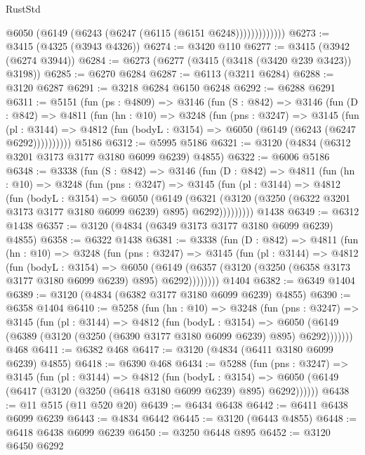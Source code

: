 \begin{lexlean}{RustStd}
\begin{coremodule}
{\begin{coremodule}
{{{{{{{{{{{{{{{{{{{{{{{{{{                  @6050 (@6149 (@6243 (@6247 (@6115 (@6151 @6248)))))))))))))
@6273 := @3415 (@4325 (@3943 @4326))
@6274 := @3420 @110
@6277 := @3415 (@3942 (@6274 @3944))
@6284 := @6273 (@6277 (@3415 (@3418 (@3420 @239 @3423)) @3198))
@6285 := @6270 @6284
@6287 := @6113 (@3211 @6284)
@6288 := @3120 @6287
@6291 := @3218 @6284 @6150 @6248
@6292 := @6288 @6291
@6311 := @5151
    (fun (ps : @4809) =>
    @3146
      (fun (S : @842) =>
      @3146
        (fun (D : @842) =>
        @4811
          (fun (hn : @10) =>
          @3248
            (fun (pns : @3247) =>
            @3145
              (fun (pl : @3144) =>
              @4812 (fun (bodyL : @3154) => @6050 (@6149 (@6243 (@6247 @6292))))))))))
    @5186
@6312 := @5995 @5186
@6321 := @3120 (@4834 (@6312 @3201 @3173 @3177 @3180 @6099 @6239) @4855)
@6322 := @6006 @5186
@6348 := @3338
    (fun (S : @842) =>
    @3146
      (fun (D : @842) =>
      @4811
        (fun (hn : @10) =>
        @3248
          (fun (pns : @3247) =>
          @3145
            (fun (pl : @3144) =>
            @4812
              (fun (bodyL : @3154) =>
              @6050
                (@6149
                  (@6321
                    (@3120 (@3250 (@6322 @3201 @3173 @3177 @3180 @6099 @6239) @895) @6292)))))))))
    @1438
@6349 := @6312 @1438
@6357 := @3120 (@4834 (@6349 @3173 @3177 @3180 @6099 @6239) @4855)
@6358 := @6322 @1438
@6381 := @3338
    (fun (D : @842) =>
    @4811
      (fun (hn : @10) =>
      @3248
        (fun (pns : @3247) =>
        @3145
          (fun (pl : @3144) =>
          @4812
            (fun (bodyL : @3154) =>
            @6050
              (@6149 (@6357 (@3120 (@3250 (@6358 @3173 @3177 @3180 @6099 @6239) @895) @6292))))))))
    @1404
@6382 := @6349 @1404
@6389 := @3120 (@4834 (@6382 @3177 @3180 @6099 @6239) @4855)
@6390 := @6358 @1404
@6410 := @5258
    (fun (hn : @10) =>
    @3248
      (fun (pns : @3247) =>
      @3145
        (fun (pl : @3144) =>
        @4812
          (fun (bodyL : @3154) =>
          @6050 (@6149 (@6389 (@3120 (@3250 (@6390 @3177 @3180 @6099 @6239) @895) @6292)))))))
    @468
@6411 := @6382 @468
@6417 := @3120 (@4834 (@6411 @3180 @6099 @6239) @4855)
@6418 := @6390 @468
@6434 := @5288
    (fun (pns : @3247) =>
    @3145
      (fun (pl : @3144) =>
      @4812
        (fun (bodyL : @3154) =>
        @6050 (@6149 (@6417 (@3120 (@3250 (@6418 @3180 @6099 @6239) @895) @6292))))))
@6438 := @11 @515 (@11 @520 @20)
@6439 := @6434 @6438
@6442 := @6411 @6438 @6099 @6239
@6443 := @4834 @6442
@6445 := @3120 (@6443 @4855)
@6448 := @6418 @6438 @6099 @6239
@6450 := @3250 @6448 @895
@6452 := @3120 @6450 @6292
}}}}}}}}}}}}}}}}}}}}}}}}}}
\end{coremodule}}
\end{coremodule}
\end{lexlean}
